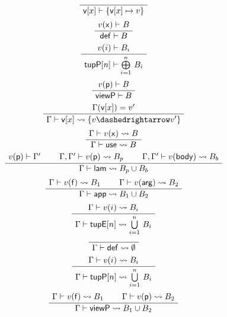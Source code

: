 \documentclass[11pt]{article} %
\theoremstyle{definition}
\begin{document}
\begin{figure}[H]
\centering
    $$
        \AxiomC{}
        \UnaryInfC{$\mathsf{v}[x] \vdash \{\mathsf{v}[x] \mapsto v\}$}
        \DisplayProof$$
    $$
        \AxiomC{$v(\mathsf{x}) \vdash B$}
        \UnaryInfC{$\mathsf{def} \vdash B$}
        \DisplayProof$$
    $$
        \AxiomC{$v(i) \vdash B_i$}
        \UnaryInfC{$\mathsf{tupP}[n] \vdash \bigoplus\limits_{i = 1}^n\,B_i$}
        \DisplayProof$$
    $$
        \AxiomC{$v(\mathsf{p}) \vdash B$}
        \UnaryInfC{$\mathsf{viewP} \vdash B$}
        \DisplayProof$$
    \vspace{0.5cm}
    $$
        \AxiomC{$\Gamma(\mathsf{v}[x]) = v'$}
        \UnaryInfC{$\Gamma \vdash \mathsf{v}[x] \leadsto \{v \dashedrightarrow v'\}$}
        \DisplayProof$$
    $$
        \AxiomC{$\Gamma \vdash v(\mathsf{x}) \leadsto B$}
        \UnaryInfC{$\Gamma \vdash \mathsf{use} \leadsto B$}
        \DisplayProof$$
    $$
        \AxiomC{$v(\mathsf{p}) \vdash \Gamma'$}
        \AxiomC{$\Gamma,\Gamma' \vdash v(\mathsf{p}) \leadsto B_p$}
        \AxiomC{$\Gamma,\Gamma' \vdash v(\mathsf{body}) \leadsto B_b$}
        \TrinaryInfC{$\Gamma \vdash \mathsf{lam} \leadsto B_p \cup B_b$}
        \DisplayProof$$
    $$
        \AxiomC{$\Gamma \vdash v(\mathsf{f}) \leadsto B_1$}
        \AxiomC{$\Gamma \vdash v(\mathsf{arg}) \leadsto B_2$}
        \BinaryInfC{$\Gamma \vdash \mathsf{app} \leadsto B_1 \cup B_2$}
        \DisplayProof$$
    $$
        \AxiomC{$\Gamma \vdash v(i) \leadsto B_i$}
        \UnaryInfC{$\Gamma \vdash \mathsf{tupE}[n] \leadsto \bigcup\limits_{i = 1}^n\,B_i$}
        \DisplayProof$$
    $$
        \AxiomC{}
        \UnaryInfC{$\Gamma \vdash \mathsf{def} \leadsto \emptyset$}
        \DisplayProof$$
    $$
        \AxiomC{$\Gamma \vdash v(i) \leadsto B_i$}
        \UnaryInfC{$\Gamma \vdash \mathsf{tupP}[n] \leadsto \bigcup\limits_{i=1}^n\,B_i$}
        \DisplayProof$$
    $$
        \AxiomC{$\Gamma \vdash v(\mathsf{f}) \leadsto B_1$}
        \AxiomC{$\Gamma \vdash v(\mathsf{p}) \leadsto B_2$}
        \BinaryInfC{$\Gamma \vdash \mathsf{viewP} \leadsto B_1 \cup B_2$}
        \DisplayProof$$
\end{figure}
\end{document}

